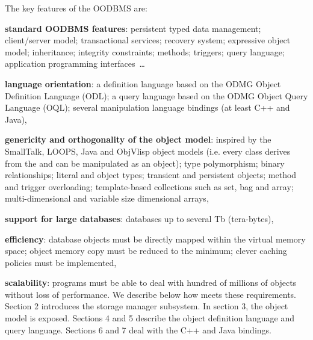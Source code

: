 The key features of the \eyedb OODBMS are:
\bi
\item {\bf standard OODBMS features}:
persistent typed data management;
client/server model; transactional services; recovery system;
expressive object model; inheritance; integrity constraints; methods;
triggers; query language; application programming interfaces~\ldots
\item {\bf language orientation}:
a definition language based on the ODMG Object Definition
Language (ODL);
a query language based on the ODMG Object Query Language (OQL);
several manipulation language bindings (at least C++ and Java),
\item {\bf genericity and orthogonality of the object model}:
inspired by the SmallTalk, LOOPS, Java and ObjVlisp object models
(i.e. every class derives from the  and can
be manipulated as an object);
type polymorphism;
binary relationships;
literal and object types;
transient and persistent objects;
method and trigger overloading;
template-based collections such as set, bag and array;
multi-dimensional and variable size dimensional arrays,
\item {\bf support for large databases}: 
databases up to several Tb (tera-bytes),
\item {\bf efficiency}:
database objects must be directly mapped within
the virtual memory space; object memory copy must be
reduced to the minimum; clever caching policies must be implemented,
\item {\bf scalability}: programs must be able to deal with hundred
of millions of objects without loss of performance.
\ei
We describe below how \eyedb meets these requirements.
Section 2 introduces the storage manager subsystem.
In section 3, the object model is exposed.
Sections 4 and 5 describe the \eyedb object definition language and
query language.
Sections 6 and 7  deal with the C++ and Java bindings.

